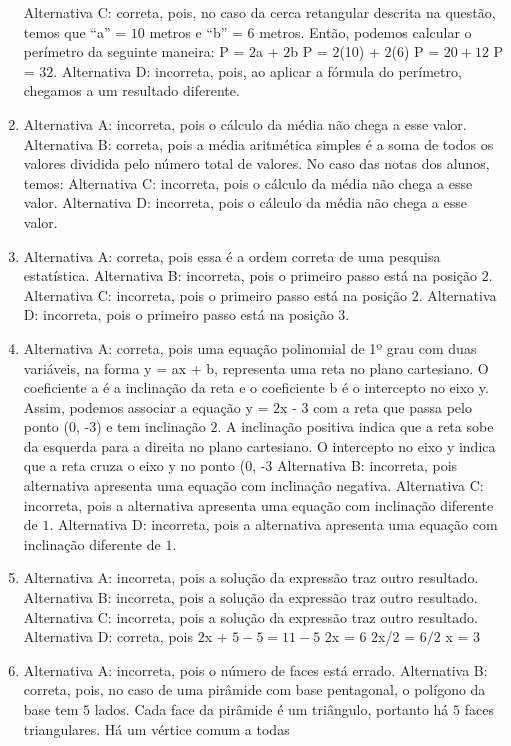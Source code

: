 \begin{enumerate}
Alternativa C: correta, pois, no caso da cerca retangular descrita na
questão, temos que ``a'' = $10$ metros e ``b'' = $6$ metros. Então, podemos
calcular o perímetro da seguinte maneira: P = $2$a + $2$b P = $2$(10) + $2$(6) P = $20 + 12$ P = $32$.
Alternativa D: incorreta, pois, ao aplicar a fórmula do perímetro,
chegamos a um resultado diferente.
\item Alternativa A: incorreta, pois o cálculo da média não chega a esse
valor.
Alternativa B: correta, pois a média aritmética simples é a soma de
todos os valores dividida pelo número total de valores. No caso das
notas dos alunos, temos:
Alternativa C: incorreta, pois o cálculo da média não chega a esse
valor.
Alternativa D: incorreta, pois o cálculo da média não chega a esse
valor.
\item Alternativa A: correta, pois essa é a ordem correta de uma pesquisa
estatística.
Alternativa B: incorreta, pois o primeiro passo está na posição $2$.
Alternativa C: incorreta, pois o primeiro passo está na posição $2$.
Alternativa D: incorreta, pois o primeiro passo está na posição $3$.
\item Alternativa A: correta, pois uma equação polinomial de 1º grau com duas
variáveis, na forma y = ax + b, representa uma reta no plano cartesiano.
O coeficiente a é a inclinação da reta e o coeficiente b é o intercepto
no eixo y. Assim, podemos associar a equação y = $2$x - $3$ com a reta que
passa pelo ponto (0, -3) e tem inclinação $2$. A inclinação positiva
indica que a reta sobe da esquerda para a direita no plano cartesiano. O
intercepto no eixo y indica que a reta cruza o eixo y no ponto (0, -3
Alternativa B: incorreta, pois alternativa apresenta uma equação com
inclinação negativa.
Alternativa C: incorreta, pois a alternativa apresenta uma equação com
inclinação diferente de $1$.
Alternativa D: incorreta, pois a alternativa apresenta uma equação com
inclinação diferente de $1$.
\item Alternativa A: incorreta, pois a solução da expressão traz outro
resultado.
Alternativa B: incorreta, pois a solução da expressão traz outro
resultado.
Alternativa C: incorreta, pois a solução da expressão traz outro
resultado.
Alternativa D: correta, pois $2$x + $5 - 5 = 11 - 5$ $2$x = $6$ $2$x/2 = $6/2$ x = $3$
\item Alternativa A: incorreta, pois o número de faces está errado.
Alternativa B: correta, pois, no caso de uma pirâmide com base
pentagonal, o polígono da base tem $5$ lados. Cada face da pirâmide é um
triângulo, portanto há $5$ faces triangulares. Há um vértice comum a todas

\end{enumerate}
